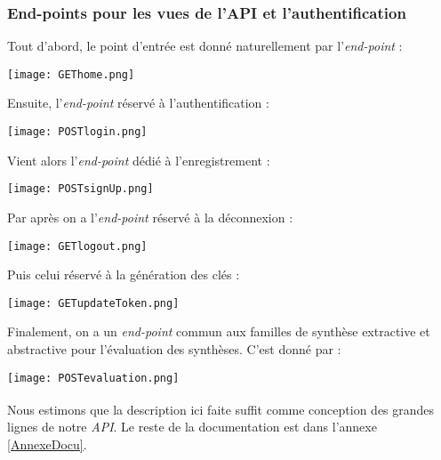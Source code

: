 \subsubsection{End-points pour les vues de l'API et l'authentification}
Tout d'abord, le point d'entrée est donné naturellement par l'\textit{end-point} :
\begin{center}
\texttt{[image: GEThome.png]}
\end{center}
Ensuite, l'\textit{end-point} réservé à l'authentification :
\begin{center}
\texttt{[image: POSTlogin.png]}
\end{center}
Vient alors l'\textit{end-point} dédié à l'enregistrement :
\begin{center}
\texttt{[image: POSTsignUp.png]}
\end{center}
Par après on a l'\textit{end-point} réservé à la déconnexion :
\begin{center}
\texttt{[image: GETlogout.png]}
\end{center}
Puis celui réservé à la génération des clés :
\begin{center}
\texttt{[image: GETupdateToken.png]}
\end{center}

Finalement, on a un \textit{end-point} commun aux familles de synthèse extractive et abstractive pour l'évaluation des synthèses. C'est donné par :
\begin{center}
\texttt{[image: POSTevaluation.png]}
\end{center}
$ _{ } $\\
Nous estimons que la description ici faite suffit comme conception des grandes lignes de notre \textit{API}. Le reste de la documentation est dans l'annexe \ref{AnnexeDocu}.
